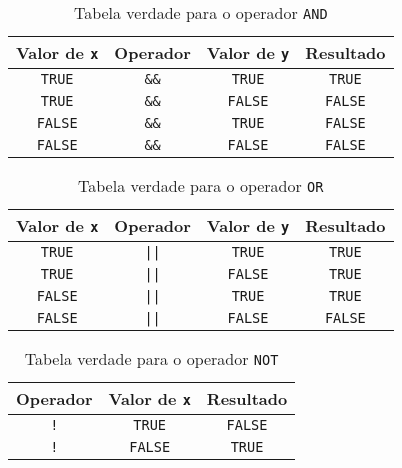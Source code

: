 \begin{table}[H]
	\centering
	\begin{tabular}{c|c|c|c}
		\hline
		\textbf{Valor de \texttt{x}} & \textbf{Operador} & \textbf{Valor de \texttt{y}} & \textbf{Resultado} \\ \hline
		\texttt{\color{green!50!black}TRUE}       & \texttt{\&\&}     & \texttt{\color{green!50!black}TRUE}       & \texttt{\color{green!50!black}TRUE}      \\
		\texttt{\color{green!50!black}TRUE}       & \texttt{\&\&}     & \texttt{\color{red!50!black}FALSE}      & \texttt{\color{red!50!black}FALSE}     \\
		\texttt{\color{red!50!black}FALSE}      & \texttt{\&\&}     & \texttt{\color{green!50!black}TRUE}       & \texttt{\color{red!50!black}FALSE}     \\
		\texttt{\color{red!50!black}FALSE}      & \texttt{\&\&}     & \texttt{\color{red!50!black}FALSE}      & \texttt{\color{red!50!black}FALSE}     \\ \hline
	\end{tabular}
	\caption{Tabela verdade para o operador \texttt{AND}}
	\label{tab:operador-e}	
\end{table}

\begin{table}[H]
	\centering
	\begin{tabular}{c|c|c|c}
		\hline
		\textbf{Valor de \texttt{x}} & \textbf{Operador} & \textbf{Valor de \texttt{y}} & \textbf{Resultado} \\ \hline
		\texttt{\color{green!50!black}TRUE}       & \texttt{||}       & \texttt{\color{green!50!black}TRUE}       & \texttt{\color{green!50!black}TRUE}      \\
		\texttt{\color{green!50!black}TRUE}       & \texttt{||}       & \texttt{\color{red!50!black}FALSE}      & \texttt{\color{green!50!black}TRUE}      \\
		\texttt{\color{red!50!black}FALSE}      & \texttt{||}       & \texttt{\color{green!50!black}TRUE}       & \texttt{\color{green!50!black}TRUE}      \\
		\texttt{\color{red!50!black}FALSE}      & \texttt{||}       & \texttt{\color{red!50!black}FALSE}      & \texttt{\color{red!50!black}FALSE}     \\ \hline
	\end{tabular}
	\caption{Tabela verdade para o operador \texttt{OR}}
	\label{tab:operador-ou}	
\end{table}

\begin{table}[H]
	\centering
	\begin{tabular}{c|c|c}
		\hline
		\textbf{Operador} & \textbf{Valor de \texttt{x}} & \textbf{Resultado} \\ \hline
		\texttt{!}        & \texttt{\color{green!50!black}TRUE}       & \texttt{\color{red!50!black}FALSE}     \\
		\texttt{!}        & \texttt{\color{red!50!black}FALSE}      & \texttt{\color{green!50!black}TRUE}      \\ \hline
	\end{tabular}
	\caption{Tabela verdade para o operador \texttt{NOT}}
	\label{tab:operador-not}
\end{table}

